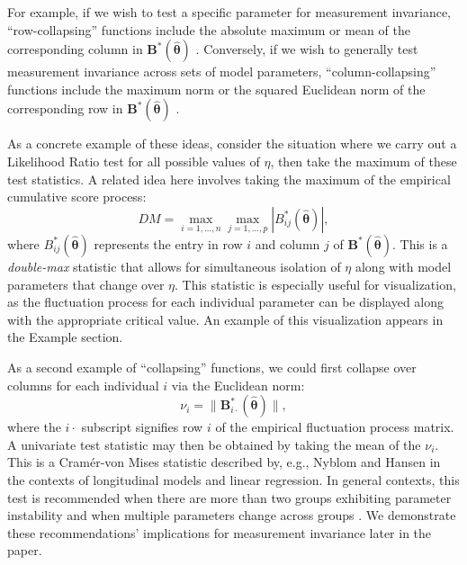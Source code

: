 \documentclass[man]{apa}
\begin{document}
For example, if we wish to test a specific parameter for
measurement invariance, ``row-collapsing''
functions include the absolute maximum or mean of the corresponding 
column in ${\bm{B}}^{\ast}(\widehat{\bm{\theta}})$
\cite{ZeiHor07}. %
Conversely, if we wish to generally test 
measurement invariance across sets of model parameters,
``column-collapsing'' functions 
include the maximum norm or the squared Euclidean norm of the
corresponding row in ${\bm{B}}^{\ast}(\widehat{\bm{\theta}})$
\cite{HjoKon02}.


As a concrete example of these ideas, consider the situation
where we carry out a Likelihood Ratio test for all possible values of
$\eta$, then take the maximum of these test statistics.  A related
idea here involves taking the maximum of the empirical cumulative
score process:
\begin{equation}
    \label{eq:doubmax}
    DM = \max_{i=1,\ldots,n} \max_{j=1,\ldots,p} |
    B^{\ast}_{ij}(\widehat{\bm{\theta}}) |,
\end{equation}
where $B^{\ast}_{ij}(\widehat{\bm{\theta}})$ represents the
entry in row $i$ and column $j$ of
${\bm{B}}^{\ast}(\widehat{\bm{\theta}})$.
This is a 
{\em{double-max}} statistic that allows for simultaneous isolation of 
$\eta$ along with model parameters that change over $\eta$.
This statistic is
especially useful for visualization, as the fluctuation process for
each individual parameter can be displayed along with the appropriate
critical value.  An example of this visualization appears in the
Example section.

As a second example of ``collapsing'' functions,
we could first collapse over columns for each individual $i$ via the
Euclidean norm:
\begin{equation}
    \label{eq:meanl2}
    \nu_i = \lVert {\bm B}^{\ast}_{i\cdot}(\widehat{\bm \theta}) \rVert,
\end{equation}
where the $i\cdot$ subscript signifies row $i$ of the empirical
fluctuation process matrix.  A univariate test statistic may then be
obtained by taking the mean of the $\nu_i$.  This is a
Cram\'{e}r-von Mises statistic described by, e.g., Nyblom
\citeyear{Nyb89} and Hansen \citeyear{Han92} in the contexts of
longitudinal models and linear regression.  In general contexts,
this test is recommended
when there are more than two groups exhibiting parameter instability 
and when multiple parameters change across groups \cite{ZeiSha10}.  
We demonstrate these recommendations' implications for
measurement invariance later in the paper.
\end{document}
